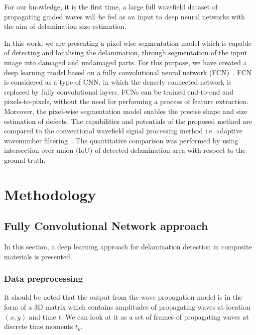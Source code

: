 \documentclass[preprint,9pt]{elsarticle}
\begin{document}
For our knowledge, it is the first time, a large full wavefield dataset of propagating guided waves will be fed as an input to deep neural networks with the aim of delamination size estimation.

In this work, we are presenting a pixel-wise segmentation model which is capable of detecting and localising the delamination, through segmentation of the input image into damaged and undamaged parts.
For this purpose, we have created a deep learning model based on a fully convolutional neural network (FCN)~\cite{long2015fully}.
FCN is considered as a type of CNN, in which the densely connected network is replaced by fully convolutional layers. 
FCNs can be trained end-to-end and pixels-to-pixels, without the need for performing a process of feature extraction. 
Moreover, the pixel-wise segmentation model enables the precise shape and size estimation of defects.
The capabilities and potentials of the proposed method are compared to the conventional wavefield signal processing method i.e. adaptive wavenumber filtering~\cite{Kudela2015,Radzienski2019}.
The quantitative comparison was performed by using intersection over union (IoU) of detected delamination area with respect to the ground truth. 
\section{Methodology}



\subsection{Fully Convolutional Network approach}
In this section, a deep learning approach for delamination detection in composite materials is presented. 
\subsubsection{Data preprocessing}
It should be noted that the output from the wave propagation model is in the form of a 3D matrix which contains amplitudes of propagating waves at location \((x, y)\) and time \(t\). We can look at it as a set of frames of propagating waves at discrete time moments \(t_k\).
\end{document}
